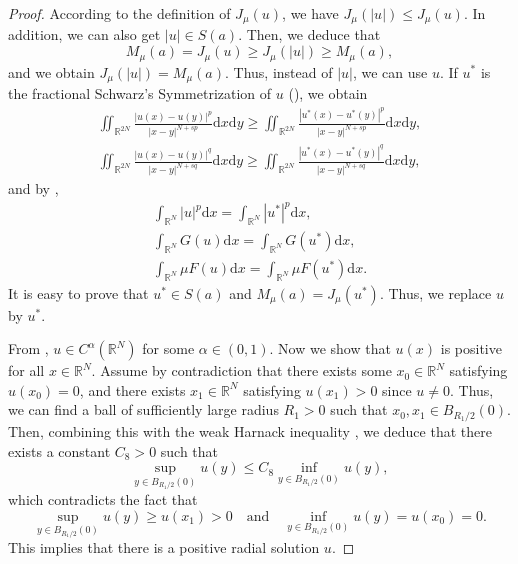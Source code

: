 \documentclass[10pt,a4paper]{amsart}
\numberwithin{equation}{section}
\begin{document}
\begin{proof}
According to the definition of $J_\mu(u)$, we have $J_\mu(|u|)\le J_\mu(u)$.
In addition, we can also get $|u|\in S(a)$. Then, we deduce that
$$
M_\mu(a)=J_\mu(u)\ge J_\mu(|u|)\ge M_\mu(a),
$$
and we obtain $J_\mu(|u|)=M_\mu(a)$. Thus, instead of $|u|$, we can use $u$. 
If $u^{*}$ is the fractional Schwarz's Symmetrization of $u$ 
(\cite[Section 9.2]{ref5}), we obtain
\begin{gather*}
\iint_{\mathbb{R}^{2N}}\frac{|u(x)-u(y)|^{p}}{|x-y|^{N+sp}}
\mathrm{d}x\mathrm{d}y\ge \iint_{\mathbb{R}^{2N}}\frac{|u^{*}(x)
-u^{*}(y)|^{p}}{|x-y|^{N+sp}}\mathrm{d}x\mathrm{d}y,\\
\iint_{\mathbb{R}^{2N}}\frac{|u(x)-u(y)|^{q}}{|x-y|^{N+sq}}\mathrm{d}x\mathrm{d}y
\ge \iint_{\mathbb{R}^{2N}}\frac{|u^{*}(x)-u^{*}(y)|^{q}}{|x-y|^{N+sq}}
\mathrm{d}x\mathrm{d}y,
\end{gather*}
and by \cite[section 3.3]{ref22},
\begin{gather*}
\int_{\mathbb{R}^N} |u|^{p}\mathrm{d}x=\int_{\mathbb{R}^N} |u^{*}|^{p}\mathrm{d}x,\\
\int_{\mathbb{R}^N} G(u)\mathrm{d}x=\int_{\mathbb{R}^N} G(u^{*})\mathrm{d}x,\\
\int_{\mathbb{R}^N}\mu F(u)\mathrm{d}x=\int_{\mathbb{R}^N}\mu F(u^{*})\mathrm{d}x.
\end{gather*}
It is easy to prove that $u^{*}\in S(a)$ and $M_\mu(a)=J_\mu(u^{*})$. 
Thus, we replace $u$ by $u^{*}$.

From \cite{n4},  $u \in C^{\alpha}(\mathbb{R}^N)$ for some $\alpha\in (0,1)$. 
Now we show that $u(x)$ is positive for all $x\in\mathbb{R}^N$.
Assume by contradiction that there exists some $x_0\in\mathbb{R}^N$ satisfying 
$u(x_0)=0$, and there exists $x_1\in\mathbb{R}^N$ satisfying $u(x_1)>0$ since 
$u\neq 0$.
Thus, we can find a ball of sufficiently large radius
$R_1 > 0$ such that $x_0, x_1 \in B_{R_1/2}(0)$.
Then, combining this with the weak Harnack inequality \cite{n1}, we deduce that 
there exists a constant $C_8 > 0$ such that
$$
\sup_{y\in B_{R_1/2}(0)}  u(y)\le C_8\underset{y\in B_{R_1/2}(0)}\inf u(y),
$$
which contradicts the fact that
$$
\sup_{y\in B_{R_1/2}(0)}u(y)\ge u(x_1)>0\quad \text{and}\quad
\inf_{y\in B_{R_1/2}(0)}u(y)=u(x_0)=0.
$$
This implies that there is a positive radial solution $u$.


\end{proof}
\end{document}
